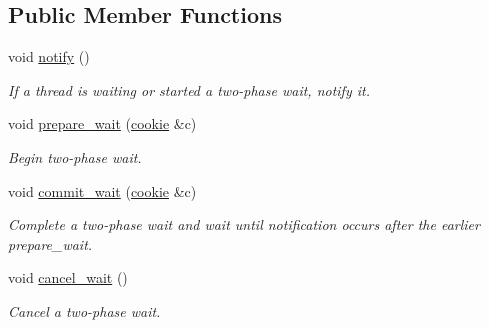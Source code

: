 \subsection*{Public Member Functions}
\begin{DoxyCompactItemize}
\item 
void \hyperlink{classrml_1_1internal_1_1thread__monitor_a3d1ae1d2476f27d49814bedd78bca43a}{notify} ()
\begin{DoxyCompactList}\small\item\em If a thread is waiting or started a two-\/phase wait, notify it. \end{DoxyCompactList}\item 
void \hyperlink{classrml_1_1internal_1_1thread__monitor_aa70a8ea008c6fbf2edfc1282a6926fb8}{prepare\+\_\+wait} (\hyperlink{classrml_1_1internal_1_1thread__monitor_1_1cookie}{cookie} \&c)
\begin{DoxyCompactList}\small\item\em Begin two-\/phase wait. \end{DoxyCompactList}\item 
\hypertarget{classrml_1_1internal_1_1thread__monitor_aade3c809fbe1271d73a0a68a56987c84}{}void \hyperlink{classrml_1_1internal_1_1thread__monitor_aade3c809fbe1271d73a0a68a56987c84}{commit\+\_\+wait} (\hyperlink{classrml_1_1internal_1_1thread__monitor_1_1cookie}{cookie} \&c)\label{classrml_1_1internal_1_1thread__monitor_aade3c809fbe1271d73a0a68a56987c84}

\begin{DoxyCompactList}\small\item\em Complete a two-\/phase wait and wait until notification occurs after the earlier prepare\+\_\+wait. \end{DoxyCompactList}\item 
\hypertarget{classrml_1_1internal_1_1thread__monitor_aaeb8faebaa89d96f89d537bd9c2782b7}{}void \hyperlink{classrml_1_1internal_1_1thread__monitor_aaeb8faebaa89d96f89d537bd9c2782b7}{cancel\+\_\+wait} ()\label{classrml_1_1internal_1_1thread__monitor_aaeb8faebaa89d96f89d537bd9c2782b7}

\begin{DoxyCompactList}\small\item\em Cancel a two-\/phase wait. \end{DoxyCompactList}\end{DoxyCompactItemize}
